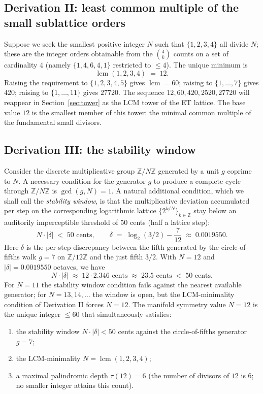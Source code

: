 \documentclass[11pt,a4paper]{article}
\theoremstyle{definition}
\theoremstyle{remark}
\newcommand{\Z}{\mathbb{Z}}
\DeclareMathOperator{\lcm}{lcm}
\begin{document}
\subsection{Derivation II: least common multiple of the small sublattice orders}

Suppose we seek the smallest positive integer $N$ such that $\{1,2,3,4\}$ all divide $N$; these are the integer orders obtainable from the $\binom{4}{k}$ counts on a set of cardinality $4$ (namely $\{1,4,6,4,1\}$ restricted to $\le 4$). The unique minimum is
\[
\lcm(1,2,3,4) \;=\; 12.
\]
Raising the requirement to $\{1,2,3,4,5\}$ gives $\lcm=60$; raising to $\{1,\ldots,7\}$ gives $420$; raising to $\{1,\ldots,11\}$ gives $27720$. The sequence $12,60,420,2520,27720$ will reappear in Section~\ref{sec:tower} as the LCM tower of the ET lattice. The base value $12$ is the smallest member of this tower: the minimal common multiple of the fundamental small divisors.

\subsection{Derivation III: the stability window}

Consider the discrete multiplicative group $\Z/N\Z$ generated by a unit $g$ coprime to $N$. A necessary condition for the generator $g$ to produce a complete cycle through $\Z/N\Z$ is $\gcd(g,N)=1$. A natural additional condition, which we shall call the \emph{stability window}, is that the multiplicative deviation accumulated per step on the corresponding logarithmic lattice $\{2^{k/N}\}_{k\in\Z}$ stay below an auditorily imperceptible threshold of $50$ cents (half a lattice step):
\[
N\cdot|\delta| \;<\; 50 \text{ cents}, \qquad \delta \;=\; \log_{2}(3/2) - \frac{7}{12} \;\approx\; 0.0019550.
\]
Here $\delta$ is the per-step discrepancy between the fifth generated by the circle-of-fifths walk $g=7$ on $\Z/12\Z$ and the just fifth $3/2$. With $N=12$ and $|\delta| = 0.0019550$ octaves, we have
\[
N\cdot|\delta| \;\approx\; 12\cdot 2.346\text{ cents} \;\approx\; 23.5 \text{ cents} \;<\; 50 \text{ cents}.
\]
For $N=11$ the stability window condition fails against the nearest available generator; for $N=13,14,\ldots$ the window is open, but the LCM-minimality condition of Derivation II forces $N=12$. The manifold symmetry value $N=12$ is the unique integer $\le 60$ that simultaneously satisfies:
\begin{enumerate}[leftmargin=*,label=(\roman*)]
\item the stability window $N\cdot|\delta|<50$ cents against the circle-of-fifths generator $g=7$;
\item the LCM-minimality $N=\lcm(1,2,3,4)$;
\item a maximal palindromic depth $\tau(12)=6$ (the number of divisors of $12$ is $6$; no smaller integer attains this count).
\end{enumerate}
\end{document}
